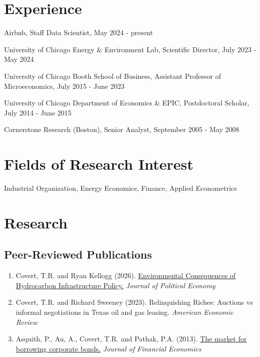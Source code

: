 \documentclass[10pt,letterpaper]{article}
\renewenvironment{itemize}{
  \begin{list}{}{
    \setlength{\leftmargin}{1.5em}
    \setlength{\itemsep}{0.25em}
    \setlength{\parskip}{0pt}
    \setlength{\parsep}{0.25em}
  }
}{
  \end{list}
}
\begin{document}
\section*{Experience}


\begin{itemize}
\item Airbnb, Staff Data Scientist, May 2024 - present
\item University of Chicago Energy \& Environment Lab, Scientific Director, July 2023 - May 2024
\item University of Chicago Booth School of Business, Assistant Professor of Microeconomics, July 2015 - June 2023
\item University of Chicago Department of Economics \& EPIC, Postdoctoral Scholar, July 2014 - June 2015
\item Cornerstone Research (Boston), Senior Analyst, September 2005 - May 2008
\end{itemize}






\section*{Fields of Research Interest}


Industrial Organization, Energy Economics, Finance, Applied Econometrics


\section*{Research}


\subsection*{Peer-Reviewed Publications}


\begin{enumerate}
\item Covert, T.R. and Ryan Kellogg (2026).  \href{https://kelloggryan.com/Papers/CBRpaper_withappx.pdf}{Environmental Consequences of Hydrocarbon Infrastructure Policy.}  \textit{Journal of Political Economy}
\item Covert, T.R. and Richard Sweeney (2023).  Relinquishing Riches: Auctions vs informal negotiations in Texas oil and gas leasing.  \textit{American Economic Review}
\item Asquith, P., Au, A., Covert, T.R. and Pathak, P.A. (2013).   \href{http://home.uchicago.edu/~tcovert/shortbonds.pdf}{The market for borrowing corporate bonds.}  \textit{Journal of Financial Economics}
\end{enumerate}
\end{document}
